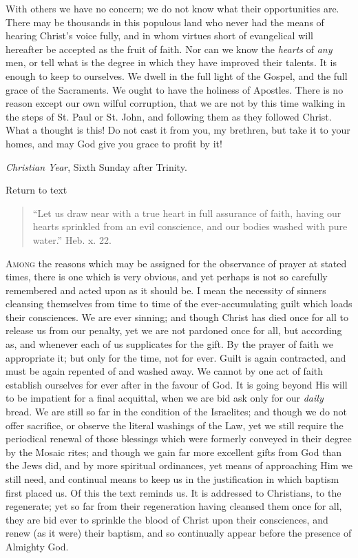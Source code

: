 With others we have no concern; we do not know what
their opportunities are. There may be thousands in this
populous land who never had the means of hearing Christ's
voice fully, and in whom virtues short of evangelical
will hereafter be accepted as the fruit of faith. Nor can
we know the \emph{hearts} of \emph{any} men, or tell
what is the degree in which they have improved their
talents. It is enough to keep to ourselves. We dwell in
the full light of the Gospel, and the full grace of the
Sacraments. We ought to have the holiness of Apostles.
There is no reason except our own wilful corruption, that
we are not by this time walking in the steps of St. Paul
or St. John, and following them as they followed Christ.
What a thought is this! Do not cast it from you, my
brethren, but take it to your homes, and may God give you
grace to profit by it!


\emph{Christian Year},
Sixth Sunday after Trinity.

Return to text


\begin{quote}

``Let us draw near with a true heart in full
assurance of faith, having our hearts sprinkled from
an evil conscience, and our bodies washed with pure
water.'' Heb. x. 22.

\end{quote}

A\textsc{mong} the reasons which may be assigned for the
observance of prayer at stated times, there is one which
is very obvious, and yet perhaps is not so carefully
remembered and acted upon as it should be. I mean the
necessity of sinners cleansing themselves from time to
time of the ever-accumulating guilt which loads their
consciences. We are ever sinning; and though Christ has
died once for all to release us from our penalty, yet we
are not pardoned once for all, but according as, and
whenever each of us supplicates for the gift. By the
prayer of faith we appropriate it; but only for the time,
not for ever. Guilt is again contracted, and must be
again repented of and washed away. We cannot by one act
of faith establish ourselves for ever after in the favour
of God. It is going beyond His will to be impatient for a
final acquittal, when we are bid ask only for our \emph{daily}
bread. We are still so far in the condition of the
Israelites; and though we do not offer sacrifice, or
observe the literal washings of the Law, yet we still
require the periodical renewal of those blessings which
were formerly conveyed in their degree by the Mosaic
rites; and though we gain far more excellent gifts from
God than the Jews did, and by more spiritual ordinances,
yet means of approaching Him we still need, and continual
means to keep us in the justification in which baptism
first placed us. Of this the text reminds us. It is
addressed to Christians, to the regenerate; yet so far
from their regeneration having cleansed them once for
all, they are bid ever to sprinkle the blood of Christ
upon their consciences, and renew (as it were) their
baptism, and so continually appear before the presence of
Almighty God.

